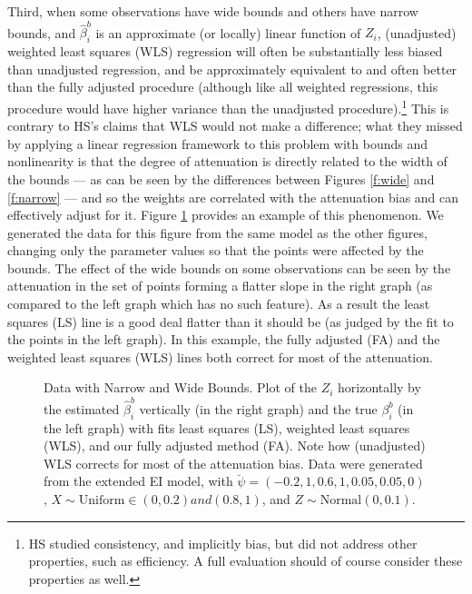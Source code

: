 \documentclass[11pt,titlepage]{article}
\begin{document}
Third, when some observations have wide bounds and others have narrow
bounds, and $\hat\beta_i^b$ is an approximate (or locally) linear
function of $Z_i$, (unadjusted) weighted least squares (WLS)
regression will often be substantially less biased than unadjusted
regression, and be approximately equivalent to and often better than
the fully adjusted procedure (although like all weighted regressions,
this procedure would have higher variance than the unadjusted
procedure).\footnote{HS studied consistency, and implicitly bias, but
  did not address other properties, such as efficiency.  A full
  evaluation should of course consider these properties as well.}
This is contrary to HS's claims that WLS would not make a difference;
what they missed by applying a linear regression framework to this
problem with bounds and nonlinearity is that the degree of attenuation
is directly related to the width of the bounds --- as can be seen by
the differences between Figures \ref{f:wide} and \ref{f:narrow} ---
and so the weights are correlated with the attenuation bias and can
effectively adjust for it.  Figure \ref{f:mixed} provides an example
of this phenomenon.  We generated the data for this figure from the
same model as the other figures, changing only the parameter values so
that the points were affected by the bounds.  The effect of the wide
bounds on some observations can be seen by the attenuation in the set
of points forming a flatter slope in the right graph (as compared to
the left graph which has no such feature).  As a result the least
squares (LS) line is a good deal flatter than it should be (as judged
by the fit to the points in the left graph).  In this example, the
fully adjusted (FA) and the weighted least squares (WLS) lines both
correct for most of the attenuation.
\begin{figure}[t]
  \begin{center}
    \caption{Data with Narrow and Wide Bounds. Plot of the $Z_i$ 
      horizontally by the estimated $\hat\beta_i^b$ vertically (in the
      right graph) and the true $\beta_i^b$ (in the left graph) with
      fits least squares (LS), weighted least squares (WLS), and our
      fully adjusted method (FA).  Note how (unadjusted) WLS corrects
      for most of the attenuation bias.  Data were generated from the
      extended EI model, with $\breve\psi=(-0.2,1,0.6,1,0.05,0.05,0)$,
      $X \sim \textrm{Uniform}\in (0,0.2) and (0.8,1)$, and $Z \sim
      \textrm{Normal}(0,0.1)$.}
    \label{f:mixed}
  \end{center}
\end{figure}
\end{document}
